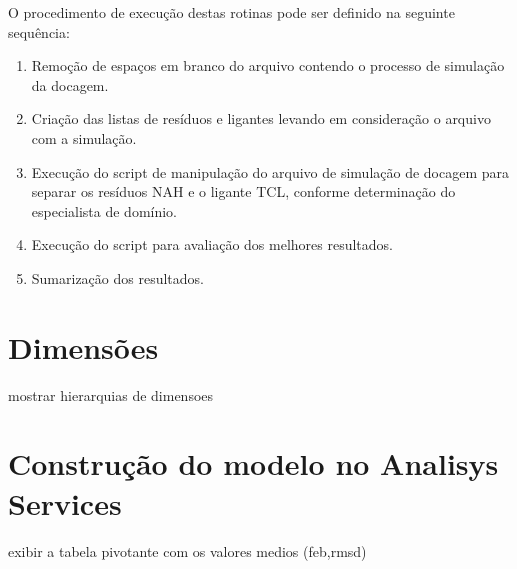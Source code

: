 O procedimento de execução destas rotinas pode ser definido na seguinte sequência:

\begin{enumerate}
    \item Remoção de espaços em branco do arquivo contendo o processo de simulação da docagem. 
    \item Criação das listas de resíduos e ligantes levando em consideração o arquivo com a simulação.
    \item Execução do script de manipulação do arquivo de simulação de docagem para separar os resíduos NAH e o ligante TCL, conforme determinação do especialista de domínio.
    \item Execução do script para avaliação dos melhores resultados.
    \item Sumarização dos resultados.
\end{enumerate}


\section{Dimensões}
	mostrar hierarquias de dimensoes
	
\section{Construção do modelo no Analisys Services}
	exibir a tabela pivotante com os valores medios (feb,rmsd)
